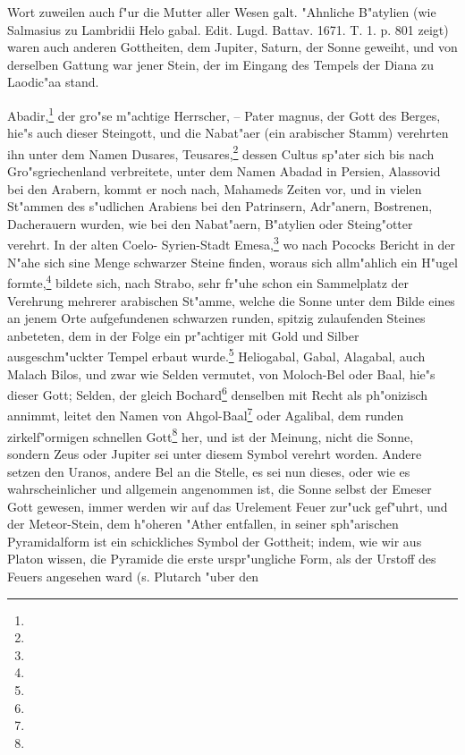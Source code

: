 \documentclass[a4paper, 11pt, oneside, polutonikogreek, german]{article}
\begin{document}
Wort zuweilen auch f"ur die Mutter aller Wesen galt. "Ahnliche B"atylien (wie Salmasius zu Lambridii Helo gabal. Edit. Lugd. Battav. 1671. T. 1. p. 801 zeigt) waren auch anderen Gottheiten, dem Jupiter, Saturn, der Sonne geweiht, und von derselben Gattung war jener Stein, der im Eingang des Tempels der Diana zu Laodic"aa stand.

Abadir,\footnote{} der gro"se m"achtige Herrscher, -- Pater magnus, der Gott des Berges, hie"s auch dieser Steingott, und die Nabat"aer (ein arabischer Stamm) verehrten ihn unter dem Namen Dusares, Teusares,\footnote{} dessen Cultus sp"ater sich bis nach Gro"sgriechenland verbreitete, unter dem Namen Abadad in Persien, Alassovid bei den Arabern, kommt er noch nach, Mahameds Zeiten vor, und in vielen St"ammen des s"udlichen Arabiens bei den Patrinsern, Adr"anern, Bostrenen, Dacherauern wurden, wie bei den Nabat"aern, B"atylien oder Steing"otter verehrt. In der alten Coelo- Syrien-Stadt Emesa,\footnote{} wo nach Pococks Bericht in der N"ahe sich sine Menge schwarzer Steine finden, woraus sich allm"ahlich ein H"ugel formte,\footnote{} bildete sich, nach Strabo, sehr fr"uhe schon ein Sammelplatz der Verehrung mehrerer arabischen St"amme, welche die Sonne unter dem Bilde eines an jenem Orte aufgefundenen schwarzen runden, spitzig zulaufenden Steines anbeteten, dem in der Folge ein pr"achtiger mit Gold und Silber ausgeschm"uckter Tempel erbaut wurde.\footnote{} Heliogabal, Gabal, Alagabal, auch Malach Bilos, und zwar wie Selden vermutet, von Moloch-Bel oder Baal, hie"s dieser Gott; Selden, der gleich Bochard\footnote{} denselben mit Recht als ph"onizisch annimmt, leitet den Namen von Ahgol-Baal\footnote{} oder Agalibal, dem runden zirkelf"ormigen schnellen Gott\footnote{} her, und ist der Meinung, nicht die Sonne, sondern Zeus oder Jupiter sei unter diesem Symbol verehrt worden. Andere setzen den Uranos, andere Bel an die Stelle, es sei nun dieses, oder wie es wahrscheinlicher und allgemein angenommen ist, die Sonne selbst der Emeser Gott gewesen, immer werden wir auf das Urelement Feuer zur"uck gef"uhrt, und der Meteor-Stein, dem h"oheren "Ather entfallen, in seiner sph"arischen Pyramidalform ist ein schickliches Symbol der Gottheit; indem, wie wir aus Platon wissen, die Pyramide die erste urspr"ungliche Form, als der Urstoff des Feuers angesehen ward (s. Plutarch "uber den 
\end{document}
